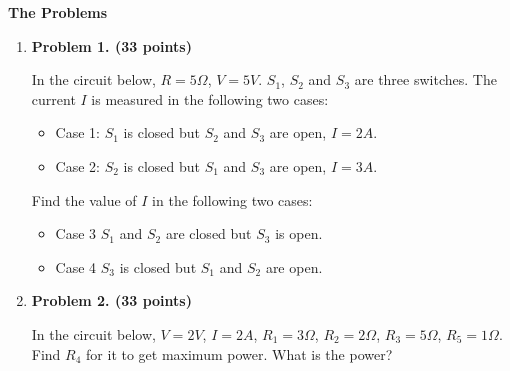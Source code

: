 {\bf The Problems}
\begin{enumerate}


\item {\bf Problem 1. (33 points)} 

  In the circuit below, $R=5\Omega$, $V=5V$. $S_1$, $S_2$ and $S_3$
  are three switches. The current $I$ is measured in the following
  two cases:
  \begin{itemize}
  \item Case 1: $S_1$ is closed but $S_2$ and $S_3$ are open, $I=2A$.
  \item Case 2: $S_2$ is closed but $S_1$ and $S_3$ are open, $I=3A$.
  \end{itemize}
  Find the value of $I$ in the following two cases:
  \begin{itemize}
  \item Case 3 $S_1$ and $S_2$ are closed but $S_3$ is open.
  \item Case 4 $S_3$ is closed but $S_1$ and $S_2$ are open.
  \end{itemize}


  \begin{comment}
  {\bf Solution:} Assume the circuit in the box is modeled by
  $R_T$ and $V_T$. 
  \begin{itemize}
  \item Case 1: $V_T/(R_T+5)=2$
  \item Case 2: $(V_T-V)/R_T=3$
  \end{itemize}
  Solving these two equations we get $V_T=20V$, $R_T=5\Omega$
  \begin{itemize}
  \item Case 3: $I=3A$
  \item Case 4: $I=1.5A$
  \end{itemize}

  \end{comment}

\item {\bf Problem 2. (33 points)} 

  In the circuit below, $V=2V$, $I=2A$, $R_1=3\Omega$, $R_2=2\Omega$,
  $R_3=5\Omega$, $R_5=1\Omega$. Find $R_4$ for it to get maximum power.
  What is the power?


  \begin{comment}
  {\bf Solution:} Find the Thenvenin model for the network excluding 
  $R_5$: $R_T=R_2+R_5=3\Omega$, $V_T=V+I\times R_2=2V+2A\time 2\Omega=6V$. 
  Then $R_4=R_T=3\Omega$ will get maximum power $P_R=3W$.
  \end{comment}


\end{enumerate}
